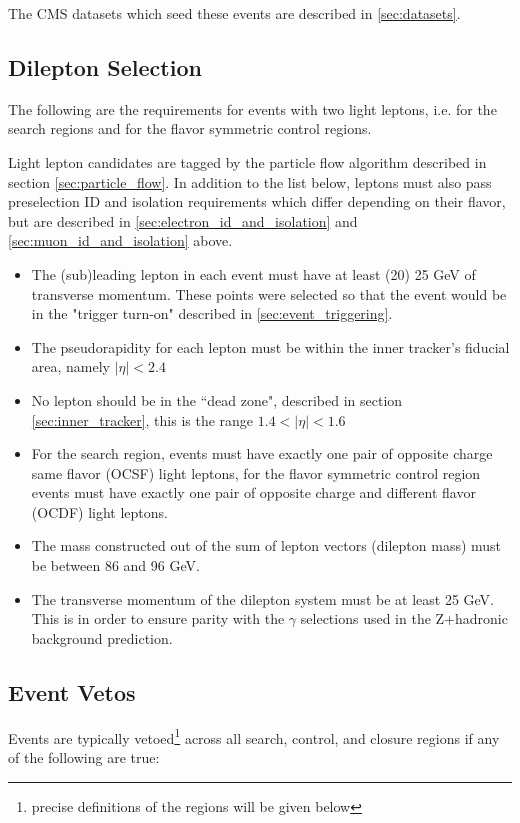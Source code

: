   The CMS datasets which seed these events are described in \ref{sec:datasets}.
  
  \subsection{Dilepton Selection} \label{sec:dilepton_selection}

    The following are the requirements for events with two light leptons, i.e. for the search regions and for the flavor symmetric control regions.  

    Light lepton candidates are tagged by the particle flow algorithm described in section \ref{sec:particle_flow}. In addition to the list below, leptons must also pass preselection ID and isolation requirements which differ depending on their flavor, but are described in \ref{sec:electron_id_and_isolation} and \ref{sec:muon_id_and_isolation} above.

    \begin{itemize}
      \item The (sub)leading lepton in each event must have at least (20) 25 GeV of transverse momentum. These points were selected so that the event would be in the "trigger turn-on" described in \ref{sec:event_triggering}.
      \item The pseudorapidity for each lepton must be within the inner tracker's fiducial area, namely $\left|\eta\right| < 2.4$
      \item No lepton should be in the ``dead zone", described in section \ref{sec:inner_tracker}, this is the range $1.4 < \left|\eta\right| < 1.6$
      \item For the search region, events must have exactly one pair of opposite charge same flavor (OCSF) light leptons, for the flavor symmetric control region events must have exactly one pair of opposite charge and different flavor (OCDF) light leptons.
      \item The mass constructed out of the sum of lepton vectors (dilepton mass) must be between 86 and 96 GeV.
      \item The transverse momentum of the dilepton system must be at least 25 GeV. This is in order to ensure parity with the $\gamma$ selections used in the Z+hadronic background prediction.
    \end{itemize}

  \subsection{Event Vetos} \label{sec:event_vetos}
    Events are typically vetoed\footnote{precise definitions of the regions will be given below} across all search, control, and closure regions if any of the following are true:

